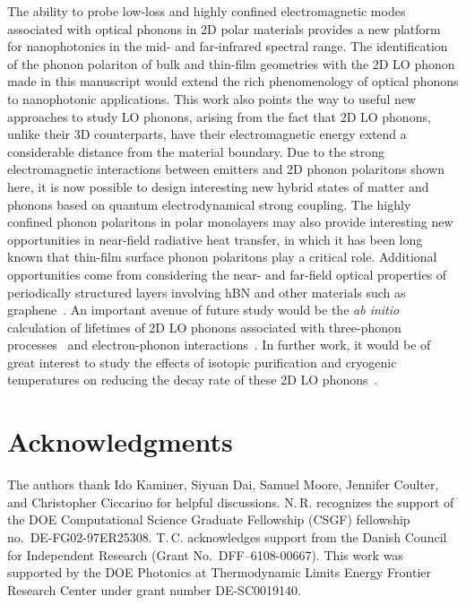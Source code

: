 \documentclass[aps,prb,twocolumn,
	           groupedaddress,superscriptaddress,
               amsfonts,amssymb,amsmath,floatfix,
	           citeautoscript]{revtex4-1}
\begin{document}
The ability to probe low-loss and highly confined electromagnetic modes associated with optical phonons in 2D polar materials provides a new platform for nanophotonics in the mid- and far-infrared spectral range. The identification of the phonon polariton of bulk and thin-film geometries with the 2D LO phonon made in this manuscript would extend the rich phenomenology of optical phonons to nanophotonic applications. This work also points the way to useful new approaches to study LO phonons, arising from the fact that 2D LO phonons, unlike their 3D counterparts, have their electromagnetic energy extend a considerable distance from the material boundary. Due to the strong electromagnetic interactions between emitters and 2D phonon polaritons shown here, it is now possible to design interesting new hybrid states of matter and phonons based on quantum electrodynamical strong coupling. The highly confined phonon polaritons in polar monolayers may also provide interesting new opportunities in near-field radiative heat transfer, in which it has been long known that thin-film surface phonon polaritons play a critical role. Additional opportunities come from considering the near- and far-field optical properties of periodically structured layers involving hBN and other materials such as graphene~\cite{papadakis2017ultralight}. An important avenue of future study would be the \emph{ab initio} calculation of lifetimes of 2D LO phonons associated with three-phonon processes~\cite{caldwell2015low,srivastava1990physics} and electron-phonon interactions~\cite{sundararaman2014theoretical, sohier2016two, ciccarino2018dynamics}. In further work, it would be of great interest to study the effects of isotopic purification and cryogenic temperatures on reducing the decay rate of these 2D LO phonons~\cite{giles2017ultra}.


\section{Acknowledgments}
The authors thank Ido Kaminer, Siyuan Dai, Samuel Moore, Jennifer Coulter, and Christopher Ciccarino for helpful discussions.
N.\,{}R. recognizes the support of the DOE Computational Science Graduate Fellowship (CSGF) fellowship no.\ DE-FG02-97ER25308. 
T.\,{}C. acknowledges support from the Danish Council for Independent Research (Grant No.\ DFF--6108-00667). 
This work was supported by the DOE Photonics at Thermodynamic Limits Energy Frontier Research Center under grant number DE-SC0019140.





\end{document}
